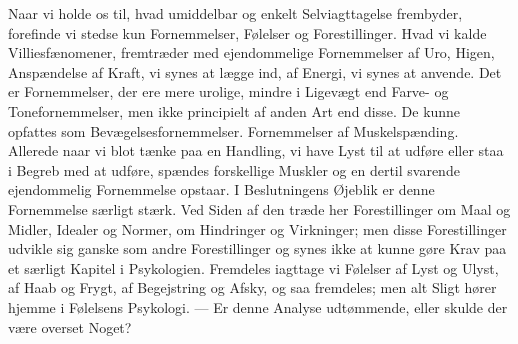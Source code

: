 \documentclass[12pt,a4paper,openany]{book}
\begin{document}
Naar vi holde os til, hvad umiddelbar og enkelt Selviagttagelse
frembyder, forefinde vi stedse kun Fornemmelser, Følelser
og Forestillinger. Hvad vi kalde Villiesfænomener, fremtræder
med ejendommelige Fornemmelser af Uro, Higen, Anspændelse
af Kraft, vi synes at lægge ind, af Energi, vi synes at anvende.
Det er Fornemmelser, der ere mere urolige, mindre i Ligevægt
end Farve- og Tonefornemmelser, men ikke principielt af anden
Art end disse. De kunne opfattes som Bevægelsesfornemmelser.
Fornemmelser af Muskelspænding. Allerede naar vi blot tænke
paa en Handling, vi have Lyst til at udføre eller staa i Begreb
med at udføre, spændes forskellige Muskler og en dertil svarende
ejendommelig Fornemmelse opstaar. I Beslutningens Øjeblik
er denne Fornemmelse særligt stærk. Ved Siden af den
træde her Forestillinger om Maal og Midler, Idealer og Normer,
om Hindringer og Virkninger; men disse Forestillinger udvikle
sig ganske som andre Forestillinger og synes ikke at kunne
gøre Krav paa et særligt Kapitel i Psykologien. Fremdeles
iagttage vi Følelser af Lyst og Ulyst, af Haab og Frygt, af
Begejstring og Afsky, og saa fremdeles; men alt Sligt hører
hjemme i Følelsens Psykologi. --- Er denne Analyse udtømmende,
eller skulde der være overset Noget?
\end{document}
